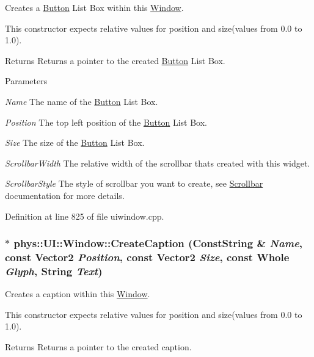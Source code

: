 Creates a \hyperlink{classphys_1_1UI_1_1Button}{Button} List Box within this \hyperlink{classphys_1_1UI_1_1Window}{Window}. 

This constructor expects relative values for position and size(values from 0.0 to 1.0). \begin{DoxyReturn}{Returns}
Returns a pointer to the created \hyperlink{classphys_1_1UI_1_1Button}{Button} List Box. 
\end{DoxyReturn}

\begin{DoxyParams}{Parameters}
\item[{\em Name}]The name of the \hyperlink{classphys_1_1UI_1_1Button}{Button} List Box. \item[{\em Position}]The top left position of the \hyperlink{classphys_1_1UI_1_1Button}{Button} List Box. \item[{\em Size}]The size of the \hyperlink{classphys_1_1UI_1_1Button}{Button} List Box. \item[{\em ScrollbarWidth}]The relative width of the scrollbar thats created with this widget. \item[{\em ScrollbarStyle}]The style of scrollbar you want to create, see \hyperlink{classphys_1_1UI_1_1Scrollbar}{Scrollbar} documentation for more details. \end{DoxyParams}


Definition at line 825 of file uiwindow.cpp.

\hypertarget{classphys_1_1UI_1_1Window_a4d4c97599313e188805c8697d4fbb13f}{
\subsubsection[{CreateCaption}]{ $\ast$ phys::UI::Window::CreateCaption ({\bf ConstString} \& {\em Name}, \/  const {\bf Vector2} {\em Position}, \/  const {\bf Vector2} {\em Size}, \/  const {\bf Whole} {\em Glyph}, \/  {\bf String} {\em Text})}}
\label{d4/d86/classphys_1_1UI_1_1Window_a4d4c97599313e188805c8697d4fbb13f}


Creates a caption within this \hyperlink{classphys_1_1UI_1_1Window}{Window}. 

This constructor expects relative values for position and size(values from 0.0 to 1.0). \begin{DoxyReturn}{Returns}
Returns a pointer to the created caption. 
\end{DoxyReturn}

